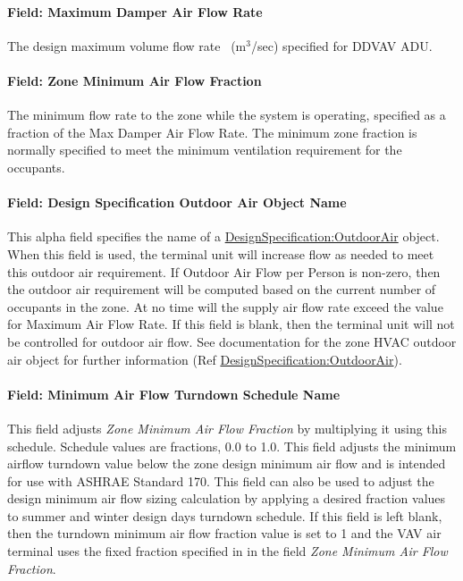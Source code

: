 \paragraph{Field: Maximum Damper Air Flow Rate}\label{field-maximum-damper-air-flow-rate}

The design maximum volume flow rate~ (m\(^{3}\)/sec) specified for DDVAV ADU.

\paragraph{Field: Zone Minimum Air Flow Fraction}\label{field-zone-minimum-air-flow-fraction-3}

The minimum flow rate to the zone while the system is operating, specified as a fraction of the Max Damper Air Flow Rate. The minimum zone fraction is normally specified to meet the minimum ventilation requirement for the occupants.

\paragraph{Field: Design Specification Outdoor Air Object Name}\label{field-design-specification-outdoor-air-object-name-2}

This alpha field specifies the name of a \hyperref[designspecificationoutdoorair]{DesignSpecification:OutdoorAir} object. When this field is used, the terminal unit will increase flow as needed to meet this outdoor air requirement. If Outdoor Air Flow per Person is non-zero, then the outdoor air requirement will be computed based on the current number of occupants in the zone. At no time will the supply air flow rate exceed the value for Maximum Air Flow Rate. If this field is blank, then the terminal unit will not be controlled for outdoor air flow. See documentation for the zone HVAC outdoor air object for further information (Ref \hyperref[designspecificationoutdoorair]{DesignSpecification:OutdoorAir}).

\paragraph{Field: Minimum Air Flow Turndown Schedule Name}

This field adjusts \textit{Zone Minimum Air Flow Fraction} by multiplying it using this schedule. Schedule values are fractions, 0.0 to 1.0. This field adjusts the minimum airflow turndown value below the zone design minimum air flow and is intended for use with ASHRAE Standard 170. This field can also be used to adjust the design minimum air flow sizing calculation by applying a desired fraction values to summer and winter design days turndown schedule. If this field is left blank, then the turndown minimum air flow fraction value is set to 1 and the VAV air terminal uses the fixed fraction specified in in the field \textit{Zone Minimum Air Flow Fraction}.


